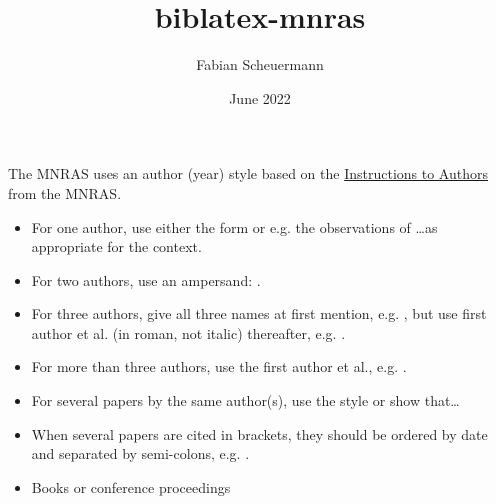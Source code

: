 \documentclass{scrartcl}
\title{biblatex-mnras}
\author{Fabian Scheuermann}
\date{June 2022}
\begin{document}
\maketitle

The MNRAS uses an author (year) style
based on the \href{https://academic.oup.com/mnras/pages/general_instructions?login=false#6.3\%20References\%20and\%20citations}{Instructions to Authors} from the MNRAS.

\begin{itemize}
  \setlength{\itemsep}{0pt}
    \item For one author, use either the form \parencite{Jacoby+1989a} or e.g. the observations of \textcite{Jacoby+1989a}\dots as appropriate for the context.
    \item For two authors, use an ampersand: \textcite{Ford+1978}. 
    \item For three authors, give all three names at first mention, e.g. \parencite{Baldwin+1981}, but use first author et al. (in roman, not italic) thereafter, e.g. \parencite{Baldwin+1981}.
    \item For more than three authors, use the first author et al., e.g. \parencite{Scheuermann+2022}.
    \item For several papers by the same author(s), use the style \parencite{Jacoby+1989a,Jacoby1997} or \parencite{Ciardullo+1989a,Ciardullo+1989b} show that\dots
    \item When several papers are cited in brackets, they should be ordered by date and separated by semi-colons, e.g. \parencite{Kreckel+2017,Pilyugin+2014}.
    \item Books \textcite{Osterbrock+2006} or conference proceedings \textcite{Ciardullo+2013}
\end{itemize}

\newrefcontext[sorting=nyt]
\printbibliography[title={References}]
\end{document}
